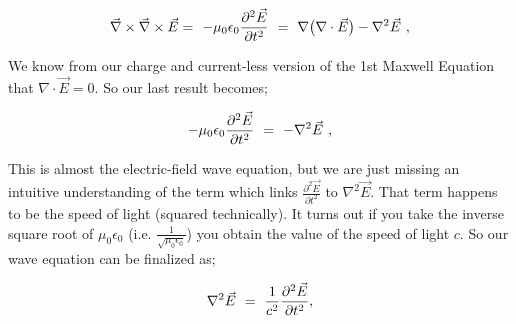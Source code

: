 \documentclass{article}
\begin{document}
\begin{equation} \label{eq:1002}
\vec{\nabla}\times\vec{\nabla}\times\vec{E} = \hspace{0.125cm} -\mu_{0}\epsilon_{0}\frac{\partial^{2}{\vec{E}}}{\partial{t}^{2}} \hspace{0.125cm} = \hspace{0.125cm} \nabla\big(\nabla\cdot\vec{E}\big) - \nabla^{2}\vec{E} \hspace{0.125cm} ,
\end{equation}

We know from our charge and current-less version of the 1st Maxwell Equation that \begin{math} \nabla\cdot\vec{E} = 0 \end{math}. So our last result becomes;

\begin{equation} \label{eq:1002}
-\mu_{0}\epsilon_{0}\frac{\partial^{2}{\vec{E}}}{\partial{t}^{2}} \hspace{0.125cm} = \hspace{0.125cm} -\nabla^{2}\vec{E} \hspace{0.125cm} ,
\end{equation}

This is almost the electric-field wave equation, but we are just missing an intuitive understanding of the term which links \begin{math} \frac{\partial^{2}{\vec{E}}}{\partial{t}^{2}} \end{math} to \begin{math} \nabla^{2}\vec{E} \end{math}. That term happens to be the speed of light (squared technically). It turns out if you take the inverse square root of \begin{math} \mu_{0}\epsilon_{0} \end{math} (i.e. \begin{math} \frac{1}{\sqrt{\mu_{0}\epsilon_{0}}} \end{math}) you obtain the value of the speed of light \begin{math} c \end{math}. So our wave equation can be finalized as;

\begin{equation} \label{eq:1002}
\nabla^{2}\vec{E} \hspace{0.125cm} = \hspace{0.125cm}   \frac{1}{c^2} \frac{\partial^{2}{\vec{E}}}{\partial{t}^{2}} ,
\end{equation}
\end{document}
